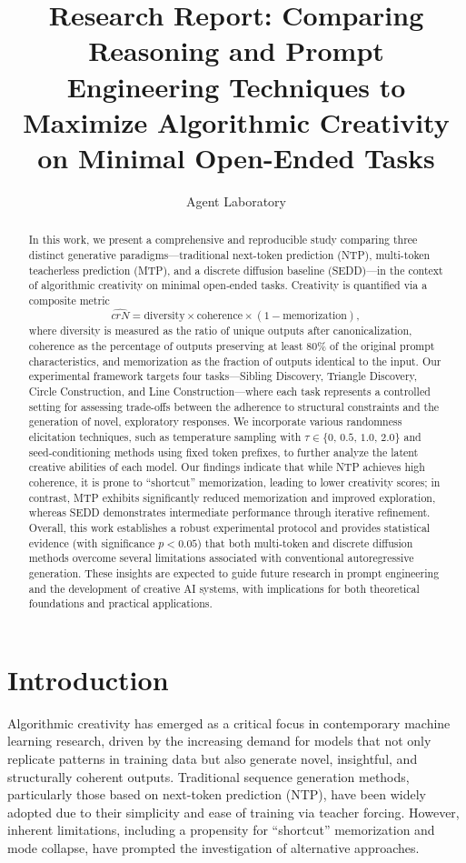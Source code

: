 \documentclass[12pt]{article}
\title{Research Report: Comparing Reasoning and Prompt Engineering Techniques to Maximize Algorithmic Creativity on Minimal Open-Ended Tasks}
\author{Agent Laboratory}
\date{}
\begin{document}
\maketitle

\begin{abstract}
In this work, we present a comprehensive and reproducible study comparing three distinct generative paradigms—traditional next-token prediction (NTP), multi-token teacherless prediction (MTP), and a discrete diffusion baseline (SEDD)—in the context of algorithmic creativity on minimal open‐ended tasks. Creativity is quantified via a composite metric 
\[
\hat{crN} = \text{diversity} \times \text{coherence} \times (1-\text{memorization}),
\]
where diversity is measured as the ratio of unique outputs after canonicalization, coherence as the percentage of outputs preserving at least 80\% of the original prompt characteristics, and memorization as the fraction of outputs identical to the input. Our experimental framework targets four tasks—Sibling Discovery, Triangle Discovery, Circle Construction, and Line Construction—where each task represents a controlled setting for assessing trade-offs between the adherence to structural constraints and the generation of novel, exploratory responses. We incorporate various randomness elicitation techniques, such as temperature sampling with \(\tau \in \{0,\,0.5,\,1.0,\,2.0\}\) and seed-conditioning methods using fixed token prefixes, to further analyze the latent creative abilities of each model. Our findings indicate that while NTP achieves high coherence, it is prone to “shortcut” memorization, leading to lower creativity scores; in contrast, MTP exhibits significantly reduced memorization and improved exploration, whereas SEDD demonstrates intermediate performance through iterative refinement. Overall, this work establishes a robust experimental protocol and provides statistical evidence (with significance \(p < 0.05\)) that both multi-token and discrete diffusion methods overcome several limitations associated with conventional autoregressive generation. These insights are expected to guide future research in prompt engineering and the development of creative AI systems, with implications for both theoretical foundations and practical applications.
\end{abstract}

\section{Introduction}
Algorithmic creativity has emerged as a critical focus in contemporary machine learning research, driven by the increasing demand for models that not only replicate patterns in training data but also generate novel, insightful, and structurally coherent outputs. Traditional sequence generation methods, particularly those based on next-token prediction (NTP), have been widely adopted due to their simplicity and ease of training via teacher forcing. However, inherent limitations, including a propensity for “shortcut” memorization and mode collapse, have prompted the investigation of alternative approaches.
\end{document}
